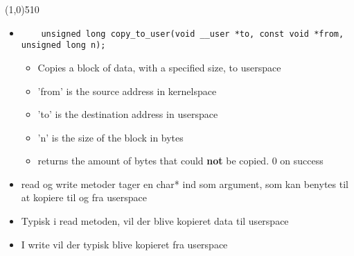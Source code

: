 \documentclass{paper}
\begin{document}
\line(1,0){510}
\begin{itemize}
	\item 
	\begin{lstlisting}
	unsigned long copy_to_user(void __user *to, const void *from, unsigned long n); 
	\end{lstlisting}
	\begin{itemize}
		\item Copies a block of data, with a specified size, to userspace
		\item 'from' is the source address in kernelspace
		\item 'to' is the destination address in userspace
		\item 'n' is the size of the block in bytes
		\item returns the amount of bytes that could \textbf{not} be copied. 0 on success
	\end{itemize}
	\item read og write metoder tager en char* ind som argument, som kan benytes til at kopiere til og fra userspace
	\item Typisk i read metoden, vil der blive kopieret data til userspace
	\item I write vil der typisk blive kopieret fra userspace
\end{itemize}
\end{document}
